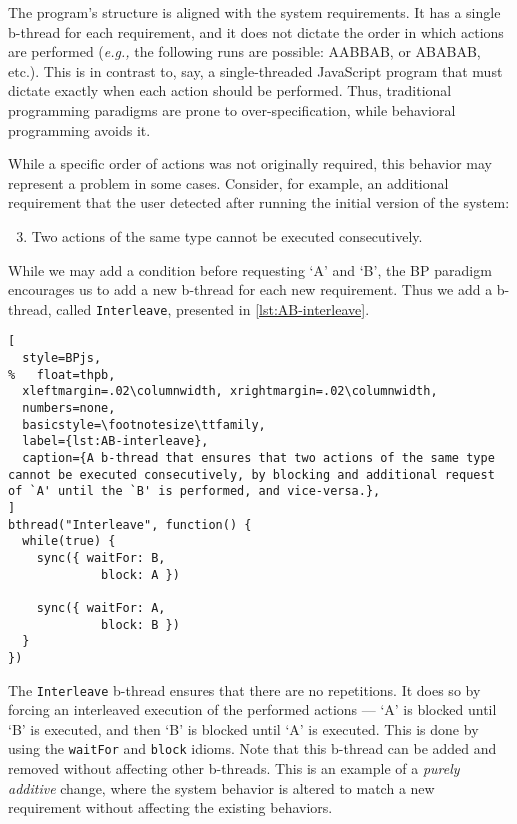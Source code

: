\documentclass[10pt,journal,compsoc]{IEEEtran}
\theoremstyle{definition}
\newcommand{\eg}{\emph{e.g.,}\xspace}
\begin{document}
The program's structure is aligned with the system requirements. It has a single b-thread for each requirement, and it does not dictate the order in which actions are performed (\eg the following runs are possible: AABBAB, or ABABAB, etc.). This is in contrast to, say, a single-threaded JavaScript program that must dictate exactly when each action should be performed. Thus, traditional programming paradigms are prone to over-specification, while behavioral programming avoids it.

While a specific order of actions was not originally required, this behavior may represent a problem in some cases. Consider, for example, an additional requirement that the user detected after running the initial version of the system:
\begin{enumerate}
\setcounter{enumi}{2}
\item Two actions of the same type cannot be executed consecutively.
\end{enumerate}
While we may add a condition before requesting `A' and `B', the BP paradigm encourages us to add a new b-thread for each new requirement. Thus we add a b-thread, called \texttt{Interleave}, presented in \autoref{lst:AB-interleave}.

\begin{lstlisting}[
  style=BPjs,
%   float=thpb,
  xleftmargin=.02\columnwidth, xrightmargin=.02\columnwidth,
  numbers=none,
  basicstyle=\footnotesize\ttfamily,
  label={lst:AB-interleave},
  caption={A b-thread that ensures that two actions of the same type cannot be executed consecutively, by blocking and additional request of `A' until the `B' is performed, and vice-versa.},
]
bthread("Interleave", function() {
  while(true) {
    sync({ waitFor: B, 
             block: A })
             
    sync({ waitFor: A, 
             block: B })
  }
})
\end{lstlisting}

The \texttt{Interleave} b-thread ensures that there are no repetitions. It does so by forcing an interleaved execution of the performed actions ---  `A' is blocked until `B' is executed, and then `B' is blocked until `A' is executed. This is done by using the \texttt{waitFor} and \texttt{block} idioms. Note that this b-thread can be added and removed without affecting other b-threads. This is an example of a \emph{purely additive} change, where the system behavior is altered to match a new requirement without affecting the existing behaviors.
\end{document}
